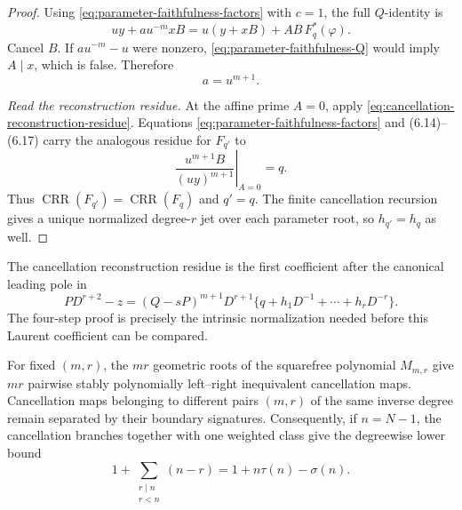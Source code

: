 \begin{proof}
Using \eqref{eq:parameter-faithfulness-factors} with $c=1$, the full
$Q$-identity is
\[
 uy+a u^{-m}xB
 =u(y+xB)+AB\,F_q^*(\varphi).                          \tag{6.16}
 \label{eq:parameter-faithfulness-Q}
\]
Cancel $B$.  If $a u^{-m}-u$ were nonzero,
\eqref{eq:parameter-faithfulness-Q} would imply
$A\mid x$, which is false.  Therefore
\[
 a=u^{m+1}.                                             \tag{6.17}
\]

\smallskip
\noindent\emph{Read the reconstruction residue.}
At the affine prime $A=0$, apply
\eqref{eq:cancellation-reconstruction-residue}.
Equations \eqref{eq:parameter-faithfulness-factors} and (6.14)--(6.17)
carry the analogous residue for $F_{q'}$ to
\[
 \left.\frac{u^{m+1}B}{(uy)^{m+1}}\right|_{A=0}=q.
\]
Thus $\operatorname{CRR}(F_{q'})=\operatorname{CRR}(F_q)$ and $q'=q$.  The
finite cancellation recursion gives a unique normalized
degree-$r$ jet over each parameter root, so $h_{q'}=h_q$ as well.
\end{proof}

\begin{remark}
The cancellation reconstruction residue is the first coefficient after the
canonical leading pole
in
\[
 PD^{r+2}-z
 =(Q-sP)^{m+1}D^{r+1}
 \{q+h_1D^{-1}+\cdots+h_rD^{-r}\}.                     \tag{6.19}
\]
The four-step proof is precisely the intrinsic normalization needed before
this Laurent coefficient can be compared.
\end{remark}

\begin{corollary}
\label{cor:cancellation-root-classes}
For fixed $(m,r)$, the $mr$ geometric roots of the squarefree polynomial
$M_{m,r}$ give $mr$ pairwise stably polynomially left--right inequivalent
cancellation maps.  Cancellation maps belonging to different pairs $(m,r)$
of the same inverse degree remain separated by their boundary signatures.
Consequently, if $n=N-1$, the cancellation branches together with one
weighted class give the degreewise lower bound
\[
 1+\sum_{\substack{r\mid n\\r<n}}(n-r)
 =1+n\tau(n)-\sigma(n).
\]
\end{corollary}

